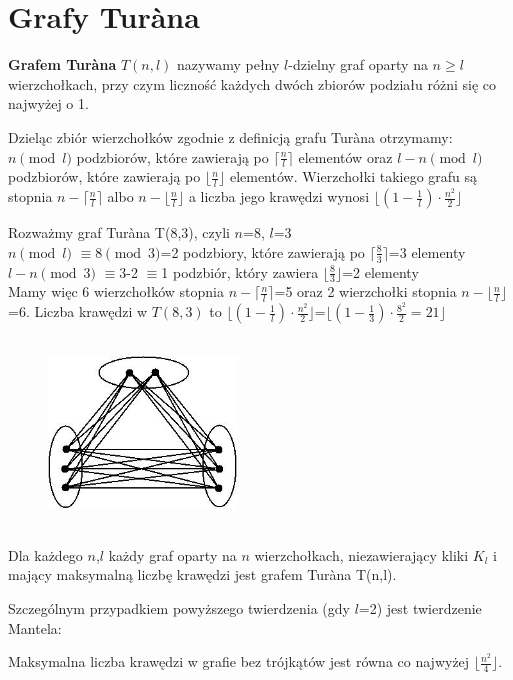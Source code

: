\documentclass[miz,woman]{mgrwms}
\begin{document}
\section{Grafy Tur\`ana}
\begin{defi}
 \textbf{Grafem Tur\`ana} $T(n,l)$ nazywamy pełny $l$-dzielny graf oparty na $n\geq l$ wierzchołkach, przy czym liczność każdych
dwóch zbiorów podziału różni się co najwyżej o 1. 
\end{defi}
Dzieląc zbiór wierzchołków zgodnie z definicją grafu  Tur\`ana otrzymamy: $n \pmod l$ podzbiorów, które zawierają po $\lceil \frac{n}{l} \rceil$
elementów oraz $l-n\pmod l$ podzbiorów, które zawierają po $\lfloor \frac{n}{l} \rfloor$ elementów. Wierzchołki takiego grafu są stopnia $n-\lceil \frac{n}{l} \rceil$
albo $n- \lfloor \frac{n}{l} \rfloor$ a liczba jego krawędzi wynosi $\lfloor(1-\frac{1}{l}) \cdot \frac{n^2}{2} \rfloor$\\

\begin{przy}
Rozważmy graf Tur\`ana T(8,3), czyli $n$=8, $l$=3\\
$n\pmod l$  $\equiv $8$\pmod 3$=2 podzbiory, które zawierają po $\lceil \frac{8}{3} \rceil$=3 elementy\\
$l-n\pmod 3$ $\equiv $3-2 $\equiv $1 podzbiór, który zawiera $\lfloor \frac{8}{3} \rfloor$=2 elementy\\
Mamy więc 6 wierzchołków stopnia $n-\lceil \frac{n}{l} \rceil$=5 oraz 2 wierzchołki stopnia $n- \lfloor \frac{n}{l} \rfloor$=6.
Liczba krawędzi w $T(8,3)$ to $\lfloor(1-\frac{1}{l}) \cdot \frac{n^2}{2} \rfloor$=$\lfloor(1-\frac{1}{3}) \cdot \frac{8^2}{2}=21 \rfloor$
\begin{figure}[h]
\centering
\includegraphics[width=5cm, height=5cm]{grafTurana.jpeg}
\end{figure}
\end{przy}

\begin{tw}
 Dla każdego $n$,$l$ każdy graf oparty na $n$ wierzchołkach, niezawierający  kliki $K_l$ i mający maksymalną
liczbę krawędzi jest grafem Tur\`ana T(n,l).
\end{tw}
Szczególnym przypadkiem powyższego twierdzenia (gdy $l$=2) jest twierdzenie Mantela:
\begin{tw}
 Maksymalna liczba krawędzi w grafie bez trójkątów jest równa co najwyżej $\lfloor \frac{n^2}{4} \rfloor$.
\end{tw}
\newpage
\end{document}
